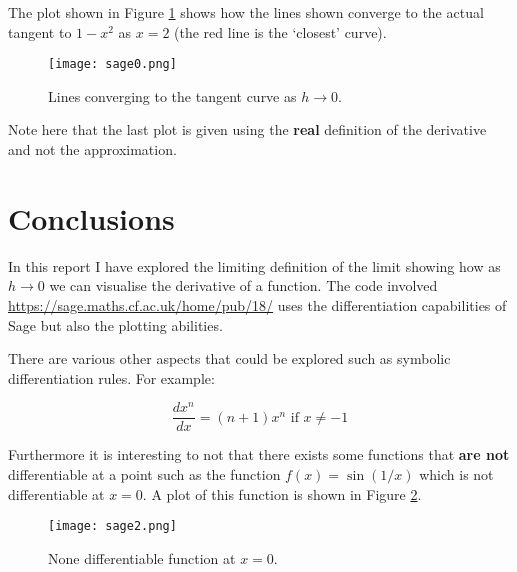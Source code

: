 \documentclass[11pt,letterpaper]{article}
\begin{document}
The plot shown in Figure \ref{lines} shows how the lines shown converge to the actual tangent to $1-x^2$ as $x=2$ (the red line is the `closest' curve).

\begin{figure}[!htbp]
\begin{center}
\texttt{[image: sage0.png]}
\end{center}
\caption{Lines converging to the tangent curve as $h\to0$.}\label{lines}
\end{figure}

Note here that the last plot is given using the \textbf{real} definition of the derivative and not the approximation.

\section{Conclusions}

In this report I have explored the limiting definition of the limit showing how as $h\to 0$ we can visualise the derivative of a function. The code involved \url{https://sage.maths.cf.ac.uk/home/pub/18/} uses the differentiation capabilities of Sage but also the plotting abilities.

There are various other aspects that could be explored such as symbolic differentiation rules. For example:

$$\frac{dx^n}{dx}=(n+1)x^{n}\text{ if }x\ne-1$$

Furthermore it is interesting to not that there exists some functions that \textbf{are not} differentiable at a point such as the function $f(x)=\sin(1/x)$ which is not differentiable at $x=0$. A plot of this function is shown in Figure \ref{notdiff}.

\begin{figure}[!htbp]
\begin{center}
\texttt{[image: sage2.png]}
\end{center}
\caption{None differentiable function at $x=0$.}\label{notdiff}
\end{figure}




\end{document}

